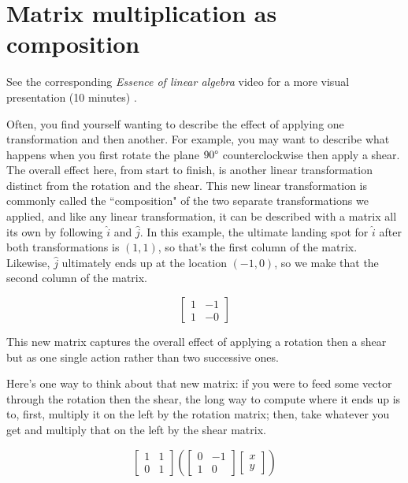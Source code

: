 \section{Matrix multiplication as composition}

\begin{remark}
  See the corresponding \textit{Essence of linear algebra} video for a more
  visual presentation (10 minutes)
  \cite{bib:linalg_matrix_multiplication_as_composition}.
\end{remark}

Often, you find yourself wanting to describe the effect of applying one
transformation and then another. For example, you may want to describe what
happens when you first rotate the plane $90\degree$ counterclockwise then apply
a shear. The overall effect here, from start to finish, is another linear
transformation distinct from the rotation and the shear. This new linear
transformation is commonly called the ``composition" of the two separate
transformations we applied, and like any linear transformation, it can be
described with a matrix all its own by following $\hat{i}$ and $\hat{j}$. In
this example, the ultimate landing spot for $\hat{i}$ after both transformations
is $(1, 1)$, so that's the first column of the matrix. Likewise, $\hat{j}$
ultimately ends up at the location $(-1, 0)$, so we make that the second column
of the matrix.

\begin{equation*}
  \begin{bmatrix}
    1 & -1 \\
    1 & -0
  \end{bmatrix}
\end{equation*}

This new matrix captures the overall effect of applying a rotation then a shear
but as one single action rather than two successive ones.

Here's one way to think about that new matrix: if you were to feed some vector
through the rotation then the shear, the long way to compute where it ends up is
to, first, multiply it on the left by the rotation matrix; then, take whatever
you get and multiply that on the left by the shear matrix.

\begin{equation*}
  \begin{bmatrix}
    1 & 1 \\
    0 & 1
  \end{bmatrix}\left(
  \begin{bmatrix}
    0 & -1 \\
    1 & 0
  \end{bmatrix}
  \begin{bmatrix}
    x \\
    y
  \end{bmatrix}\right)
\end{equation*}

